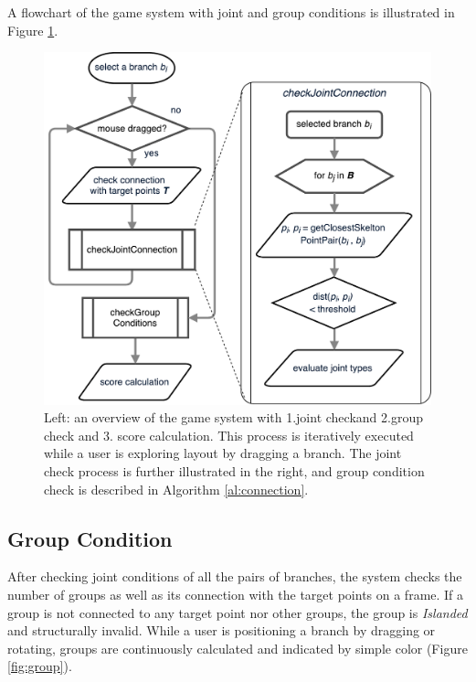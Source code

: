 A flowchart of the game system with joint and group conditions is illustrated in Figure \ref{fig:system_flowchart}.

\begin{figure}[ht]
	\begin{center}
		\includegraphics[width = 0.35\paperwidth]{images/system/closestPointAlgorithm.pdf}
		\caption{Left: an overview of the game system with 1.joint checkand 2.group check and 3. score calculation. This process is iteratively executed while a user is exploring layout by dragging a branch. The joint check process is further illustrated in the right, and group condition check is described in Algorithm \ref{al:connection}. }
		\label{fig:system_flowchart}
	\end{center}
\end{figure}




\subsection{Group Condition}

After checking joint conditions of all the pairs of branches, the system checks the number of groups as well as its connection with the target points on a frame.
If a group is not connected to any target point nor other groups, the group is \textit{Islanded} and structurally invalid.
While a user is positioning a branch by dragging or rotating, groups are continuously calculated and indicated by simple color (Figure \ref{fig:group}).

